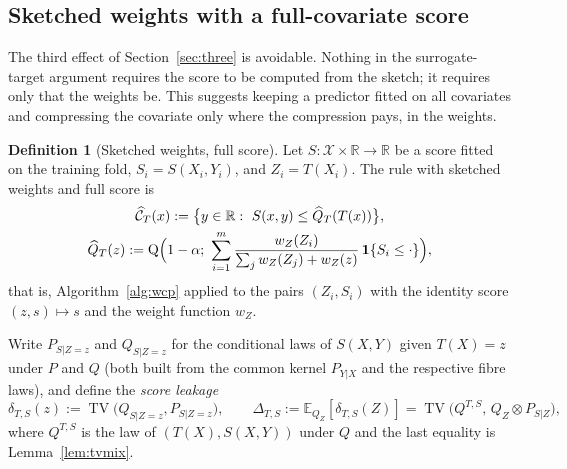 \documentclass[11pt,a4paper]{article}
\newcommand{\E}{\mathbb{E}}
\newcommand{\R}{\mathbb{R}}
\newcommand{\TV}{\operatorname{TV}}
\newcommand{\Cset}{\widehat{\mathcal C}}
\newcommand{\ind}{\mathbf 1}
\DeclareMathOperator{\Qf}{Q}
\theoremstyle{plain}
\theoremstyle{definition}
\newtheorem{definition}[theorem]{Definition}
\theoremstyle{remark}
\begin{document}
\subsection{Sketched weights with a full-covariate score}\label{sec:fullscore}

The third effect of Section~\ref{sec:three} is avoidable. Nothing in the surrogate-target argument requires the score to be computed from the sketch; it requires only that the weights be. This suggests keeping a predictor fitted on all covariates and compressing the covariate only where the compression pays, in the weights.

\begin{definition}[Sketched weights, full score]\label{def:fullscore}
Let $S:\mathcal X\times\R\to\R$ be a score fitted on the training fold, $S_i=S(X_i,Y_i)$, and $Z_i=T(X_i)$. The rule with sketched weights and full score is
\begin{gather*}
\Cset_T(x):=\bigl\{y\in\R:\ S(x,y)\le\widehat Q_T(T(x))\bigr\},\\
\widehat Q_T(z):=\Qf\Bigl(1-\alpha;\ \sum_{i=1}^m\frac{w_Z(Z_i)}{\sum_jw_Z(Z_j)+w_Z(z)}\,\ind\{S_i\le\cdot\}\Bigr),
\end{gather*}
that is, Algorithm~\ref{alg:wcp} applied to the pairs $(Z_i,S_i)$ with the identity score $(z,s)\mapsto s$ and the weight function $w_Z$.
\end{definition}

Write $P_{S|Z=z}$ and $Q_{S|Z=z}$ for the conditional laws of $S(X,Y)$ given $T(X)=z$ under $P$ and $Q$ (both built from the common kernel $P_{Y|X}$ and the respective fibre laws), and define the \emph{score leakage}
\[
\delta_{T,S}(z):=\TV\bigl(Q_{S|Z=z},P_{S|Z=z}\bigr),\qquad
\Delta_{T,S}:=\E_{Q_Z}[\delta_{T,S}(Z)]=\TV\bigl(Q^{T,S},\,Q_Z\otimes P_{S|Z}\bigr),
\]
where $Q^{T,S}$ is the law of $(T(X),S(X,Y))$ under $Q$ and the last equality is Lemma~\ref{lem:tvmix}.
\end{document}
